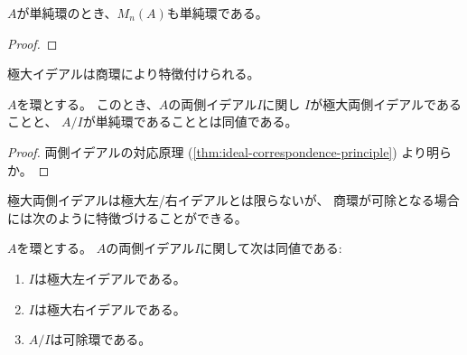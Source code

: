 \documentclass[report]{jlreq}
\begin{document}


\begin{theorem}[単純環の全行列環は単純環]
    $A$が単純環のとき、$M_n(A)$も単純環である。
\end{theorem}

\begin{proof}
    \TODO{}
\end{proof}

極大イデアルは商環により特徴付けられる。

\begin{theorem}[極大イデアルと商環]
    $A$を環とする。
    このとき、$A$の両側イデアル$I$に関し
    $I$が極大両側イデアルであることと、
    $A/I$が単純環であることとは同値である。
\end{theorem}

\begin{proof}
    両側イデアルの対応原理 (\cref{thm:ideal-correspondence-principle})
    より明らか。
\end{proof}

極大両側イデアルは極大左/右イデアルとは限らないが、
商環が可除となる場合には次のように特徴づけることができる。

\begin{theorem}[極大イデアルと可除環]
    $A$を環とする。
    $A$の両側イデアル$I$に関して次は同値である:
    \begin{enumerate}
        \item $I$は極大左イデアルである。
        \item $I$は極大右イデアルである。
        \item $A/I$は可除環である。
    \end{enumerate}
\end{theorem}
\end{document}
